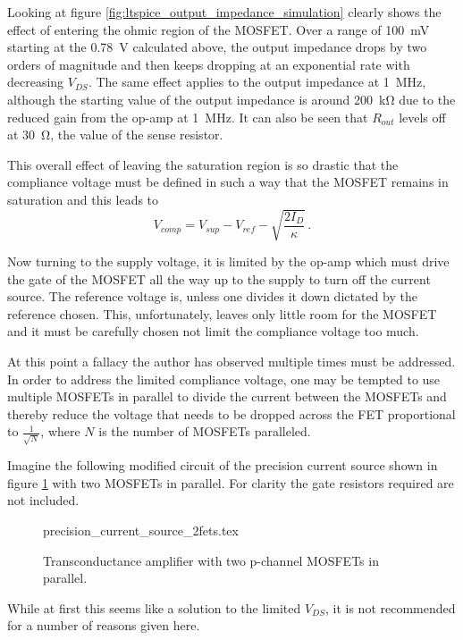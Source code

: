 Looking at figure \ref{fig:ltspice_output_impedance_simulation} clearly shows the effect of entering the ohmic region of the MOSFET. Over a range of \qty{100}{\mV} starting at the \qty{0.78}{\V} calculated above, the output impedance drops by two orders of magnitude and then keeps dropping at an exponential rate with decreasing $V_{DS}$. The same effect applies to the output impedance at \qty{1}{\MHz}, although the starting value of the output impedance is around \qty{200}{\kilo\ohm} due to the reduced gain from the op-amp at \qty{1}{\MHz}. It can also be seen that $R_{out}$ levels off at \qty{30}{\ohm}, the value of the sense resistor.

This overall effect of leaving the saturation region is so drastic that the compliance voltage must be defined in such a way that the MOSFET remains in saturation and this leads to
\begin{equation}
    V_{comp} = V_{sup} - V_{ref} - \sqrt{\frac{2 I_D}{\kappa}} \,.
\end{equation}

Now turning to the supply voltage, it is limited by the op-amp which must drive the gate of the MOSFET all the way up to the supply to turn off the current source. The reference voltage is, unless one divides it down dictated by the reference chosen. This, unfortunately, leaves only little room for the MOSFET and it must be carefully chosen not limit the compliance voltage too much.

At this point a fallacy the author has observed multiple times must be addressed. In order to address the limited compliance voltage, one may be tempted to use multiple MOSFETs in parallel to divide the current between the MOSFETs and thereby reduce the voltage that needs to be dropped across the FET proportional to $\frac{1}{\sqrt{N}}$, where $N$ is the number of MOSFETs paralleled.

Imagine the following modified circuit of the precision current source shown in figure \ref{fig:precision_current_source_two_mosfets} with two MOSFETs in parallel. For clarity the gate resistors required are not included.
\begin{figure}[ht]
    \centering
    {precision_current_source_2fets.tex}
    \caption{Transconductance amplifier with two p-channel MOSFETs in parallel.}
    \label{fig:precision_current_source_two_mosfets}
\end{figure}

While at first this seems like a solution to the limited $V_{DS}$, it is not recommended for a number of reasons given here.

